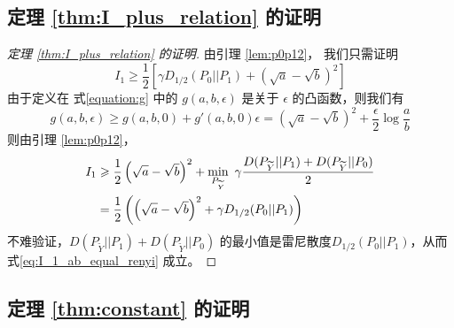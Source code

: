 \subsection{定理 \ref{thm:I_plus_relation} 的证明}

\begin{proof}[定理 \ref{thm:I_plus_relation} 的证明]
    由引理 \ref{lem:p0p12}，
    我们只需证明
    $$
    I_1 \geq 
    \frac{1}{2}\left[
        \gamma D_{1/2}(P_0||P_1)
    + \left(\sqrt{a} - \sqrt{b}\right)^2
    \right]
    $$
    由于定义在 式\eqref{equation:g} 中的 $g(a,b,\epsilon)$ 是关于 $\epsilon$
    的凸函数，则我们有
    \begin{equation}\label{eq:g_linear}
            g(a,b,\epsilon) \geq g(a,b,0) + g'(a,b,0)\epsilon = \left(\sqrt{a} - \sqrt{b}\right)^2 + \frac{\epsilon}{2}\log \frac{a}{b}
        \end{equation}
        则由引理 \ref{lem:p0p12}，
        \begin{align}
            I_1 &\geq \frac{1}{2}\left(\sqrt{a} - \sqrt{b}\right)^2+\min_{P_{\widetilde{Y}}}\ 
            \gamma
            \frac{D(P_{\widetilde{Y}} || P_1) + D(P_{\widetilde{Y}} || P_0)}{2} \notag\\
            &= \frac{1}{2}\left(\left(\sqrt{a} - \sqrt{b}\right)^2+\gamma D_{1/2}(P_0||P_1)
            \right)
            \label{eq:I_1_ab_equal_renyi}
        \end{align}
        不难验证，$D(P_{\widetilde{Y}} || P_1) + D(P_{\widetilde{Y}} || P_0)$
        的最小值是雷尼散度$D_{1/2}(P_0||P_1)$，从而
        式\eqref{eq:I_1_ab_equal_renyi} 成立。
\end{proof}

\subsection{定理 \ref{thm:constant} 的证明}

